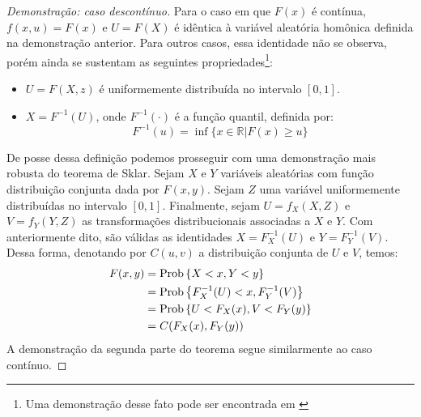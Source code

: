 \begin{Teorema}
\begin{proof}[Demonstração: caso descontínuo]
Para o caso em que $F(x)$ é contínua, $f(x, u) = F(x)$ e $U = F(X)$ é idêntica à variável aleatória homônica definida na demonstração anterior. Para outros casos, essa identidade não se observa, porém ainda se sustentam as seguintes propriedades\footnote{Uma demonstração desse fato pode ser encontrada em \citet{Ruschendorf2009}}:
\begin{itemize}
 \item $U = F(X, z)$ é uniformemente distribuída no intervalo $[0,1]$. 
 \item $X = F^{-1}(U)$, onde $F^{-1}(\cdot)$ é a função quantil, definida por:
 \[
  F^{-1}(u) = \inf\{x \in \mathbb{R} | F(x) \ge u\}
 \]
\end{itemize}
De posse dessa definição podemos prosseguir com uma demonstração mais robusta do teorema de Sklar. Sejam $X$ e $Y$ variáveis aleatórias com função distribuição conjunta dada por $F(x, y)$. Sejam $Z$ uma variável uniformemente distribuídas no intervalo $[0,1]$. Finalmente, sejam $U = f_X(X,Z)$ e $V = f_Y(Y,Z)$ as transformações distribucionais associadas a $X$ e $Y$. Com anteriormente dito, são válidas as identidades $X = F_X^{-1}(U)$ e $Y = F_Y^{-1}(V)$. Dessa forma, denotando por $C(u,v)$ a distribuição conjunta de $U$ e $V$, temos:
\begin{align*}
 F(x,y) & = \mathrm{Prob}\left\{X < x, Y < y\right\} \\ &= \mathrm{Prob}\left\{F_X^{-1}(U) < x , F_Y^{-1}(V)\right\} \\&= \mathrm{Prob}\left\{U < F_X(x), V < F_Y(y)\right\}\\
        & = C(F_X(x), F_Y(y))
\end{align*}
A demonstração da segunda parte do teorema segue similarmente ao caso contínuo. 
\end{proof}
\end{Teorema}


